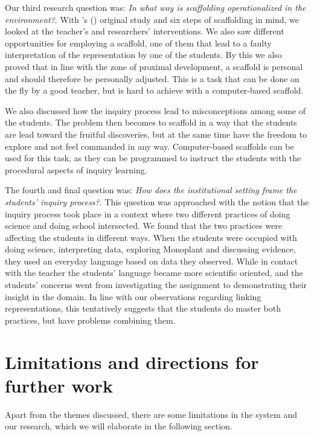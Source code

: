 
Our third research question was: \emph{In what way is scaffolding operationalized in the environment?}.
With \citeauthor{wood1976role}'s (\citeyear{wood1976role}) original study and six steps of scaffolding in mind, we looked at the teacher's and researchers' interventions.  We also saw different opportunities for employing a scaffold, one of them that lead to a faulty interpretation of the representation by one of the students. By this we also proved that in line with the zone of proximal development, a scaffold is personal and should therefore be personally adjusted. This is a task that can be done on the fly by a good teacher, but is hard to achieve with a computer-based scaffold. 

We also discussed how the inquiry process lead to misconceptions among some of the students. The problem then becomes to scaffold in a way that the students are lead toward the fruitful discoveries, but at the same time have the freedom to explore and not feel commanded in any way. Computer-based scaffolds can be used for this task, as they can be programmed to instruct the students with the procedural aspects of inquiry learning. 

The fourth and final question was: \emph{How does the institutional setting frame the students' inquiry process?}. This question was approached with the notion that the inquiry process took place in a context where two different practices of doing science and doing school intersected. We found that the two practices were affecting the students in different ways. When the students were occupied with doing science, interpreting data, exploring Monoplant and discussing evidence, they used an everyday language based on data they observed. While in contact with the teacher the students' language became more scientific oriented, and the students' concerns went from investigating the assignment to demonstrating their insight in the domain. In line with our observations regarding linking representations, this tentatively suggests that the students do master both practices, but have problems combining them.

\section{Limitations and directions for further work}
Apart from the themes discussed, there are some limitations in the system and our research, which we will elaborate in the following section. 

